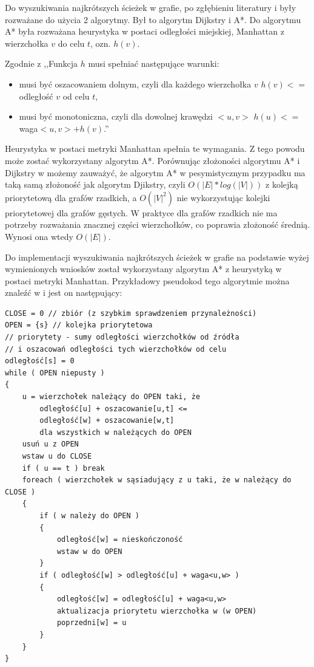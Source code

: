 \documentclass[a4paper,11pt,twoside,openright]{report}
\theoremstyle{definition}
\begin{document}
Do wyszukiwania najkrótszych ścieżek w grafie, po zgłębieniu literatury
\cite{Algorytmy Sedgewick} i \cite{AiSD2} były rozważane do użycia 2 algorytmy.
Był to algorytm Dijkstry i A*. Do algorytmu A* była rozważana heurystyka w postaci
odległości miejskiej, Manhattan z wierzchołka $v$ do celu $t$, ozn. $h(v)$.

Zgodnie z \cite{AiSD2} ,,Funkcja $h$ musi spełniać następujące warunki:

\begin{itemize}[noitemsep]
\item musi być oszacowaniem dolnym, czyli dla każdego wierzchołka $v$ $h(v) <=$ odległość $v$ od celu $t$,
\item musi być monotoniczna, czyli dla dowolnej krawędzi $<u,v>$ $h(u) <= $waga$<u,v> + h(v)$.''
\end{itemize}

Heurystyka w postaci metryki Manhattan spełnia te wymagania. Z tego powodu może
zostać wykorzystany algorytm A*. Porównując złożoności algorytmu A* i Dijkstry w
\cite{AiSD2} możemy zauważyć, że algorytm A* w pesymistycznym przypadku ma taką
samą złożoność jak algorytm Djikstry, czyli $O(|E|*log(|V|))$ z kolejką priorytetową
dla grafów rzadkich, a $O(|V|^2)$ nie wykorzystując kolejki priorytetowej dla
grafów gęstych. W praktyce dla grafów rzadkich nie ma potrzeby rozważania znacznej
części wierzchołków, co poprawia złożoność średnią. Wynosi ona wtedy $O(|E|)$.

Do implementacji wyszukiwania najkrótszych ścieżek w grafie na podstawie wyżej
wymienionych wniosków został wykorzystany algorytm A* z heurystyką w postaci
metryki Manhattan. Przykładowy pseudokod tego algorytmie można znaleźć w
\cite{AiSD2} i jest on następujący: %

\begin{verbatim}
CLOSE = 0 // zbiór (z szybkim sprawdzeniem przynależności)
OPEN = {s} // kolejka priorytetowa
// priorytety - sumy odległości wierzchołków od źródła
// i oszacowań odległości tych wierzchołków od celu
odległość[s] = 0
while ( OPEN niepusty )
{
    u = wierzchołek należący do OPEN taki, że
        odległość[u] + oszacowanie[u,t] <=
        odległość[w] + oszacowanie[w,t]
        dla wszystkich w należących do OPEN
    usuń u z OPEN
    wstaw u do CLOSE
    if ( u == t ) break
    foreach ( wierzchołek w sąsiadujący z u taki, że w należący do CLOSE )
    {
        if ( w należy do OPEN )
        {
            odległość[w] = nieskończoność
            wstaw w do OPEN
        }
        if ( odległość[w] > odległość[u] + waga<u,w> )
        {
            odległość[w] = odległość[u] + waga<u,w>
            aktualizacja priorytetu wierzchołka w (w OPEN)
            poprzedni[w] = u
        }
    }
}
\end{verbatim}
\end{document}
